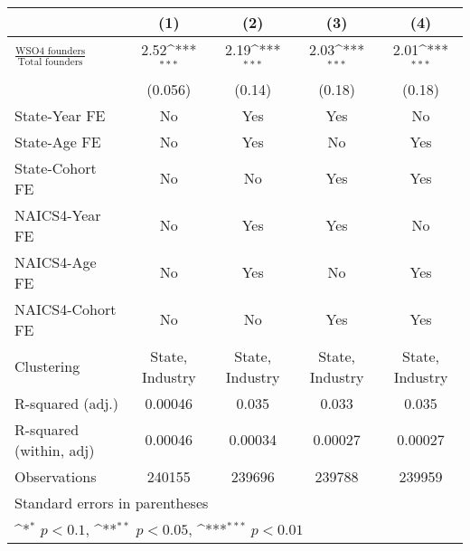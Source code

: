 {
\def\sym#1{\ifmmode^{#1}\else\(^{#1}\)\fi}
\begin{tabular}{l*{4}{c}}
\toprule
                    &\multicolumn{1}{c}{(1)}         &\multicolumn{1}{c}{(2)}         &\multicolumn{1}{c}{(3)}         &\multicolumn{1}{c}{(4)}         \\
\midrule
$\frac{\text{WSO4 founders}}{\text{Total founders}}$&        2.52\sym{***}&        2.19\sym{***}&        2.03\sym{***}&        2.01\sym{***}\\
                    &     (0.056)         &      (0.14)         &      (0.18)         &      (0.18)         \\
\addlinespace
State-Year FE       &          No         &         Yes         &         Yes         &          No         \\
\addlinespace
State-Age FE        &          No         &         Yes         &          No         &         Yes         \\
\addlinespace
State-Cohort FE     &          No         &          No         &         Yes         &         Yes         \\
\addlinespace
NAICS4-Year FE      &          No         &         Yes         &         Yes         &          No         \\
\addlinespace
NAICS4-Age FE       &          No         &         Yes         &          No         &         Yes         \\
\addlinespace
NAICS4-Cohort FE    &          No         &          No         &         Yes         &         Yes         \\
\midrule
Clustering          &State, Industry         &State, Industry         &State, Industry         &State, Industry         \\
R-squared (adj.)    &     0.00046         &       0.035         &       0.033         &       0.035         \\
R-squared (within, adj)&     0.00046         &     0.00034         &     0.00027         &     0.00027         \\
Observations        &      240155         &      239696         &      239788         &      239959         \\
\bottomrule
\multicolumn{5}{l}{\footnotesize Standard errors in parentheses}\\
\multicolumn{5}{l}{\footnotesize \sym{*} \(p<0.1\), \sym{**} \(p<0.05\), \sym{***} \(p<0.01\)}\\
\end{tabular}
}
